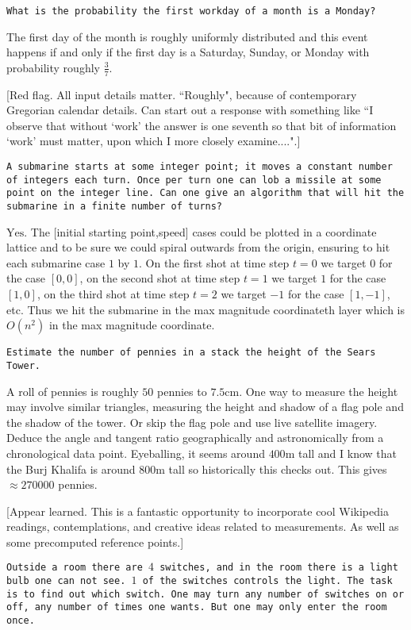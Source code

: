 \texttt{What is the probability the first workday of a month is a Monday?}

The first day of the month is roughly uniformly distributed and this event happens if and only if the first day is a Saturday, Sunday, or Monday with probability roughly $\boxed{\frac{3}{7}}$.

[Red flag. All input details matter. ``Roughly", because of contemporary Gregorian calendar details. Can start out a response with something like ``I observe that without `work' the answer is one seventh so that bit of information `work' must matter, upon which I more closely examine....".]

\texttt{A submarine starts at some integer point; it moves a constant number of integers each turn. Once per turn one can lob a missile at some point on the integer line. Can one give an algorithm that will hit the submarine in a finite number of turns?}

$\boxed{\text{Yes}}$. The [initial starting point,speed] cases could be plotted in a coordinate lattice and to be sure we could spiral outwards from the origin, ensuring to hit each submarine case $1$ by $1$. On the first shot at time step $t=0$ we target $0$ for the case $[0,0]$, on the second shot at time step $t=1$ we target $1$ for the case $[1,0]$, on the third shot at time step $t=2$ we target $-1$ for the case $[1,-1]$, etc. Thus we hit the submarine in the max magnitude coordinateth layer which is $O(n^2)$ in the max magnitude coordinate.

\texttt{Estimate the number of pennies in a stack the height of the Sears Tower.}

A roll of pennies is roughly $50$ pennies to $7.5$cm. One way to measure the height may involve similar triangles, measuring the height and shadow of a flag pole and the shadow of the tower. Or skip the flag pole and use live satellite imagery. Deduce the angle and tangent ratio geographically and astronomically from a chronological data point. Eyeballing, it seems around $400$m tall and I know that the Burj Khalifa is around $800$m tall so historically this checks out. This gives $\boxed{\approx 270000}$ pennies.

[Appear learned. This is a fantastic opportunity to incorporate cool Wikipedia readings, contemplations, and creative ideas related to measurements. As well as some precomputed reference points.]

\texttt{Outside a room there are $4$ switches, and in the room there is a light bulb one can not see. $1$ of the switches controls the light. The task is to find out which switch. One may turn any number of switches on or off, any number of times one wants. But one may only enter the room once.}

